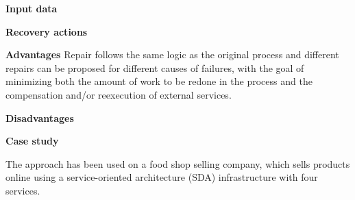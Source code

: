 \begin{compactitem}
\item[\textbf{Input data}] 

\item[\textbf{Recovery actions}]

\item[\textbf{Advantages}] 
Repair follows the same logic as the original process and different repairs can be proposed for different causes of failures, with the goal of minimizing both the amount of work to be redone in the process and the compensation and/or reexecution of external services.

\item[\textbf{Disadvantages}] 



\item[\textbf{Case study}] 


The approach has been used on a food shop selling company, which sells products online using a service-oriented architecture (SDA) infrastructure with four services.

\end{compactitem}




